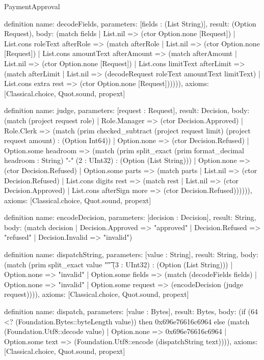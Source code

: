 \begin{lexlean}{PaymentApproval}
\begin{semanticmodule}
definition{
  name: decodeFields,
  parameters: [fields : (List String)],
  result: (Option Request),
  body: (match fields
    | List.nil => (ctor Option.none [Request])
    | List.cons roleText afterRole => (match afterRole
      | List.nil => (ctor Option.none [Request])
      | List.cons amountText afterAmount => (match afterAmount
        | List.nil => (ctor Option.none [Request])
        | List.cons limitText afterLimit => (match afterLimit
          | List.nil => (decodeRequest roleText amountText limitText)
          | List.cons extra rest => (ctor Option.none [Request]))))),
  axioms: [Classical.choice, Quot.sound, propext]
}

definition{
  name: judge,
  parameters: [request : Request],
  result: Decision,
  body: (match (project request role)
    | Role.Manager => (ctor Decision.Approved)
    | Role.Clerk => (match (prim checked_subtract (project request limit) (project request amount) : (Option Int64))
      | Option.none => (ctor Decision.Refused)
      | Option.some headroom => (match (prim split_exact (prim format_decimal headroom : String) "-" (2 : UInt32) : (Option (List String)))
        | Option.none => (ctor Decision.Refused)
        | Option.some parts => (match parts
          | List.nil => (ctor Decision.Refused)
          | List.cons digits rest => (match rest
            | List.nil => (ctor Decision.Approved)
            | List.cons afterSign more => (ctor Decision.Refused)))))),
  axioms: [Classical.choice, Quot.sound, propext]
}

definition{
  name: encodeDecision,
  parameters: [decision : Decision],
  result: String,
  body: (match decision
    | Decision.Approved => "approved"
    | Decision.Refused => "refused"
    | Decision.Invalid => "invalid")
}

definition{
  name: dispatchString,
  parameters: [value : String],
  result: String,
  body: (match (prim split_exact value "\t" (3 : UInt32) : (Option (List String)))
    | Option.none => "invalid"
    | Option.some fields => (match (decodeFields fields)
      | Option.none => "invalid"
      | Option.some request => (encodeDecision (judge request)))),
  axioms: [Classical.choice, Quot.sound, propext]
}

definition{
  name: dispatch,
  parameters: [value : Bytes],
  result: Bytes,
  body: (if (64 <? (Foundation.Bytes::byteLength value)) then 0x696e76616c6964 else (match (Foundation.Utf8::decode value)
    | Option.none => 0x696e76616c6964
    | Option.some text => (Foundation.Utf8::encode (dispatchString text)))),
  axioms: [Classical.choice, Quot.sound, propext]
}
\end{semanticmodule}
\end{lexlean}
